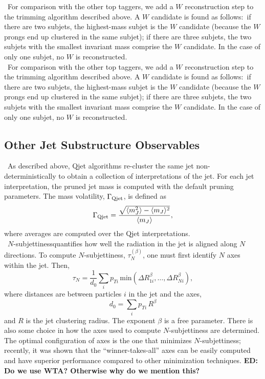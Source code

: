~For comparison with the other top taggers, we add a $W$ reconstruction step to the trimming algorithm described above. A $W$ candidate is found as follows:~if there are two subjets, the highest-mass subjet is the $W$ candidate (because the $W$ prongs end up clustered in the same subjet); if there are three subjets, the two subjets with the smallest invariant mass comprise the $W$ candidate. In the case of only one subjet, no $W$ is reconstructed.\\

~For comparison with the other top taggers, we add a $W$ reconstruction step to the trimming algorithm described above. A $W$ candidate is found as follows:~if there are two subjets, the highest-mass subjet is the $W$ candidate (because the $W$ prongs end up clustered in the same subjet); if there are three subjets, the two subjets with the smallest invariant mass comprise the $W$ candidate. In the case of only one subjet, no $W$ is reconstructed.

\subsection{Other Jet Substructure Observables}
\label{sec:substructure}

~As described above, Qjet algorithms re-cluster the same jet non-deterministically to obtain a collection of interpretations of the jet. For each jet interpretation, the pruned jet mass is computed with the default pruning parameters. The mass volatility, $\Gamma_{\rm Qjet}$, is defined as
%
\begin{equation}
\Gamma_{\rm Qjet} = \frac{\sqrt{\langle m_J^2 \rangle-\langle m_J\rangle^2}}{\langle m_J\rangle},
\end{equation}
%
where averages are computed over the Qjet interpretations.\\

~$N$-subjettiness quantifies how well the radiation in the jet is aligned along $N$ directions. To compute $N$-subjettiness, $\tau_N^{(\beta)}$, one must first identify $N$ axes within the jet. Then,
%
\begin{equation}
\tau_N = \frac{1}{d_0} \sum_i p_{Ti} \,\mathrm{min}\left( \Delta R_{1i}^\beta,\ldots,\Delta R_{Ni}^\beta\right),
\end{equation}
%
where distances are between particles $i$ in the jet and the axes,
%
\begin{equation}
d_0 = \sum_i p_{Ti}\,R^\beta
\end{equation}
%
and $R$ is the jet clustering radius. The exponent $\beta$ is a free parameter. There is also some choice in how the axes used to compute $N$-subjettiness are determined. The optimal configuration of axes is the one that minimizes
$N$-subjettiness; recently, it was shown that the ``winner-takes-all'' axes can be easily computed and have superior performance compared to other minimization techniques. {\bf ED: Do we use WTA? Otherwise why do we mention this?}

